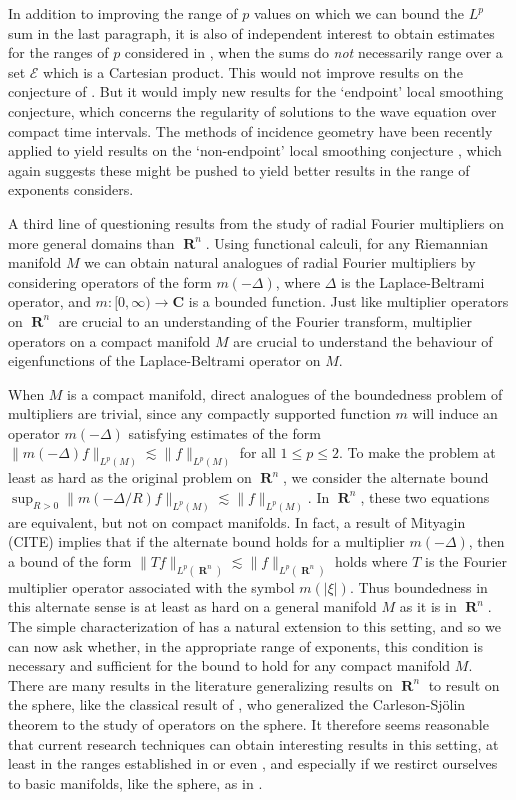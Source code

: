 \documentclass[12pt]{article}
\DeclareMathOperator{\RR}{\mathbf{R}}
\theoremstyle{plain}
\theoremstyle{remark}
\theoremstyle{definition}
\begin{document}
In addition to improving the range of $p$ values on which we can bound the $L^p$ sum in the last paragraph, it is also of independent interest to obtain estimates for the ranges of $p$ considered in \cite{Cladek}, when the sums do \emph{not} necessarily range over a set $\mathcal{E}$ which is a Cartesian product. This would not improve results on the conjecture of \cite{GarrigosandSeeger}. But it would imply new results for the `endpoint' local smoothing conjecture, which concerns the regularity of solutions to the wave equation over compact time intervals. The methods of incidence geometry have been recently applied to yield results on the `non-endpoint' local smoothing conjecture \cite{GuthandWangandZhang}, which again suggests these might be pushed to yield better results in the range of exponents \cite{Cladek} considers.

A third line of questioning results from the study of radial Fourier multipliers on more general domains than $\RR^n$. Using functional calculi, for any Riemannian manifold $M$ we can obtain natural analogues of radial Fourier multipliers by considering operators of the form $m(-\Delta)$, where $\Delta$ is the Laplace-Beltrami operator, and $m: [0,\infty) \to \mathbf{C}$ is a bounded function. Just like multiplier operators on $\RR^n$ are crucial to an understanding of the Fourier transform, multiplier operators on a compact manifold $M$ are crucial to understand the behaviour of eigenfunctions of the Laplace-Beltrami operator on $M$.

When $M$ is a compact manifold, direct analogues of the boundedness problem of multipliers are trivial, since any compactly supported function $m$ will induce an operator $m(-\Delta)$ satisfying estimates of the form $\| m(-\Delta) f \|_{L^p(M)} \lesssim \| f \|_{L^p(M)}$ for all $1 \leq p \leq 2$. To make the problem at least as hard as the original problem on $\RR^n$, we consider the alternate bound $\sup_{R > 0} \| m(-\Delta/R) f \|_{L^p(M)} \lesssim \| f \|_{L^p(M)}$. In $\RR^n$, these two equations are equivalent, but not on compact manifolds. In fact, a result of Mityagin (CITE) implies that if the alternate bound holds for a multiplier $m(-\Delta)$, then a bound of the form $\| Tf \|_{L^p(\RR^n)} \lesssim \| f \|_{L^p(\RR^n)}$ holds where $T$ is the Fourier multiplier operator associated with the symbol $m(|\xi|)$. Thus boundedness in this alternate sense is at least as hard on a general manifold $M$ as it is in $\RR^n$. The simple characterization of \cite{GarrigosandSeeger} has a natural extension to this setting, and so we can now ask whether, in the appropriate range of exponents, this condition is necessary and sufficient for the bound to hold for any compact manifold $M$. There are many results in the literature generalizing results on $\RR^n$ to result on the sphere, like the classical result of \cite{Sogge}, who generalized the Carleson-Sj\"{o}lin theorem to the study of operators on the sphere. It therefore seems reasonable that current research techniques can obtain interesting results in this setting, at least in the ranges established in \cite{HeoandNazarovandSeeger} or even \cite{Cladek}, and especially if we restirct ourselves to basic manifolds, like the sphere, as in \cite{Sogge}.
\end{document}
